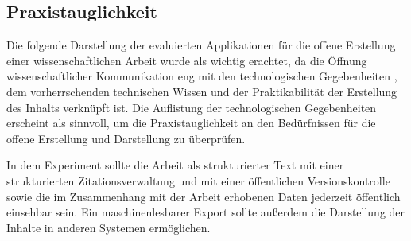 \subsection{Praxistauglichkeit}

Die folgende Darstellung der evaluierten Applikationen für die offene Erstellung einer wissenschaftlichen Arbeit wurde als wichtig erachtet, da die Öffnung wissenschaftlicher Kommunikation eng mit den technologischen Gegebenheiten \cite{Naeder_2010}, dem vorherrschenden technischen Wissen und der Praktikabilität der Erstellung des Inhalts verknüpft ist. Die Auflistung der technologischen Gegebenheiten erscheint als sinnvoll, um die Praxistauglichkeit an den Bedürfnissen für die offene Erstellung und Darstellung zu überprüfen.

In dem Experiment sollte die Arbeit als strukturierter Text mit einer strukturierten Zitationsverwaltung und mit einer öffentlichen Versionskontrolle sowie die im Zusammenhang mit der Arbeit erhobenen Daten jederzeit öffentlich einsehbar sein. Ein maschinenlesbarer Export sollte außerdem die Darstellung der Inhalte in anderen Systemen ermöglichen.

